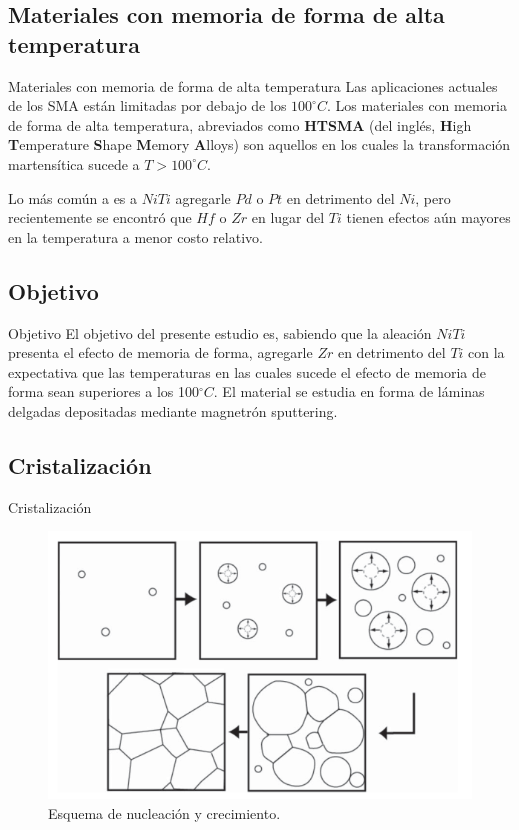 \documentclass[11pt]{beamer}
\begin{document}
	\subsection{Materiales con memoria de forma de alta temperatura}
		\begin{frame}{Materiales con memoria de forma de alta temperatura}
			Las aplicaciones actuales de los SMA están limitadas por debajo de los $100^\circ C$. Los materiales con memoria de forma de alta temperatura, abreviados como \textbf{HTSMA} (del inglés, \textbf{H}igh \textbf{T}emperature \textbf{S}hape \textbf{M}emory \textbf{A}lloys) son aquellos en los cuales la transformación martensítica sucede a $T > 100^\circ C$.
			
			Lo más común a es a $NiTi$ agregarle $Pd$ o $Pt$ en detrimento del $Ni$, pero recientemente se encontró que $Hf$ o $Zr$ en lugar del $Ti$ tienen efectos aún mayores en la temperatura a menor costo relativo.
		\end{frame}
		
	\subsection{Objetivo}
		\begin{frame}{Objetivo}
			El objetivo del presente estudio es, sabiendo que la aleación $NiTi$ presenta el efecto de memoria de forma, agregarle $Zr$ en detrimento del $Ti$ con la expectativa que las temperaturas en las cuales sucede el efecto de memoria de forma sean superiores a los 100$^\circ C$. El material se estudia en forma de láminas delgadas depositadas mediante magnetrón sputtering.
		\end{frame}
		
	\subsection{Cristalización}
		\begin{frame}{Cristalización}
			\begin{figure}
				\includegraphics[scale=0.35]{img/cristalization.png}
				\caption*{Esquema de nucleación y crecimiento.}
			\end{figure}
		\end{frame}
		
\end{document}
